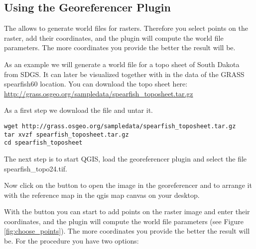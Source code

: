 \subsection{Using the Georeferencer Plugin}

The  allows to generate world files for rasters.
Therefore you select points on the raster, add their coordinates, and the plugin will compute the world file parameters.
The more coordinates you provide the better the result will be.

As an example we will generate a world file for a topo sheet of South Dakota from SDGS.
It can later be visualized together with in the data of the GRASS spearfish60 location.
You can download the topo sheet here: \url{http://grass.osgeo.org/sampledata/spearfish\_toposheet.tar.gz}

As a first step we download the file and untar it.

\begin{verbatim}
wget http://grass.osgeo.org/sampledata/spearfish_toposheet.tar.gz
tar xvzf spearfish_toposheet.tar.gz
cd spearfish_toposheet
\end{verbatim}

The next step is to start QGIS, load the georeferencer plugin and select the file spearfish\_topo24.tif.


Now click on the button  to open the image in the georeferencer and to arrange it with the reference map in the qgis map canvas on your desktop.


With the button  you can start to add points on the raster image and enter their coordinates, and the plugin will compute the world file parameters (see Figure \ref{fig:choose_points}).
The more coordinates you provide the better the result will be.
For the procedure you have two options:

